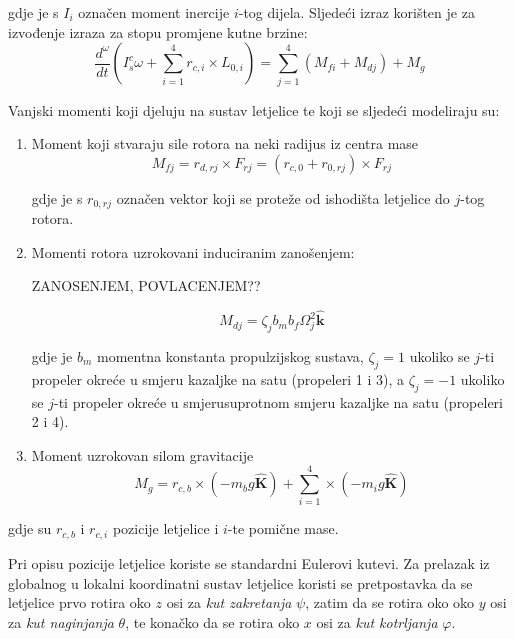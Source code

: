 \documentclass[11pt,a4paper]{article}
\begin{document}
gdje je s $I_{i}$ označen moment inercije $i$-tog dijela. Sljedeći izraz korišten je za izvođenje izraza za stopu promjene kutne brzine:
\begin{equation}
\frac{d^{\omega}}{dt} \left( I_{s}^{c} \omega + \sum_{i=1}^{4} r_{c,i}\times L_{0,i}  \right) = \sum_{j=1}^{4}(M_{fi} + M_{dj}) + M_{g}
\label{eq:dtM}
\end{equation}


Vanjski momenti koji djeluju na sustav letjelice te koji se sljedeći modeliraju su:
\begin{enumerate}
\item Moment koji stvaraju sile rotora na neki radijus iz centra mase
\begin{equation}
M_{fj} = r_{d,rj} \times F_{rj} = (r_{c,0} + r_{0,rj}) \times F_{rj}
\label{eq:Mfj}
\end{equation}

gdje je s $r_{0,rj}$ označen vektor koji se proteže od ishodišta letjelice do $j$-tog rotora.

\item Momenti rotora uzrokovani induciranim zanošenjem:

ZANOSENJEM, POVLACENJEM??

\begin{equation}
M_{dj} = \zeta_{j}b_{m}b_{f}\Omega_{j}^{2} \bm{\hat{k}}
\label{eq:Mdj}
\end{equation}

gdje je $b_{m}$ momentna konstanta propulzijskog sustava, $\zeta_{j} =  1$ ukoliko se $j$-ti propeler okreće u smjeru kazaljke na satu (propeleri 1 i 3), a $\zeta_{j} =  -1$ ukoliko se $j$-ti propeler okreće u smjerusuprotnom smjeru kazaljke na satu (propeleri 2 i 4).

\item Moment uzrokovan silom gravitacije
\begin{equation}
M_{g} = r_{c,b} \times (-m_{b}g \bm{\hat{K}}) + \sum_{i=1}^{4} \times (-m_{i}g \bm{\hat{K}})
\label{eq:Mg}
\end{equation}
\end{enumerate}

gdje su $r_{c,b}$ i $r_{c,i}$ pozicije letjelice i $i$-te pomične mase.

Pri opisu pozicije letjelice koriste se standardni Eulerovi kutevi. Za prelazak iz globalnog u lokalni koordinatni sustav letjelice koristi se pretpostavka da se letjelice prvo rotira oko $z$ osi za \textit{kut zakretanja} $\psi$, zatim da se rotira oko oko $y$ osi za \textit{kut naginjanja} $\theta$, te konačko da se rotira oko $x$ osi za \textit{kut kotrljanja} $\varphi$.
\end{document}
